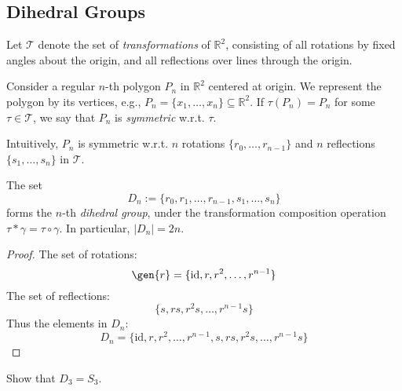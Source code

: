 \subsection{Dihedral Groups}
Let $\mathcal{T}$ denote the set of \emph{transformations} of $\mathbb{R}^2$, consisting of all rotations by fixed angles about the origin, and all reflections over lines through the origin.
\begin{definition}
Consider a regular $n$-th polygon $P_n$ in $\mathbb{R}^2$ centered at origin. We represent the polygon by its vertices, e.g., $P_n=\{x_1,\dots,x_n\}\subseteq\mathbb{R}^2$. If $\tau(P_n) = P_n$ for some $\tau\in\mathcal{T}$, we say that $P_n$ is \emph{symmetric} w.r.t. $\tau$.
\end{definition}
\begin{remark}
Intuitively, $P_n$ is symmetric w.r.t. $n$ rotations $\{r_0,\dots,r_{n-1}\}$ and $n$ reflections $\{s_1,\dots,s_n\}$ in $\mathcal{T}$.
\end{remark}
\begin{theorem}
The set
\[
D_n:=\{r_0,r_1,\dots,r_{n-1},s_1,\dots,s_n\}
\]
forms the $n$-th \emph{dihedral group}, under the transformation composition operation $\tau*\gamma = \tau\circ\gamma$. In particular, $|D_n| = 2n$.
\end{theorem}
\begin{proof}
The set of rotations:
\[
\gen{r}=\{\mbox{id},r,r^2,\dots,r^{n-1}\}
\]
The set of reflections:
\[
\{s,rs,r^2s,\dots,r^{n-1}s\}
\]
Thus the elements in $D_n$:
\[
D_n = \{\mbox{id},r,r^2,\dots,r^{n-1},s,rs,r^2s,\dots,r^{n-1}s\}
\]
\end{proof}
\begin{proposition}
Show that $D_3=S_3$.
\end{proposition}


